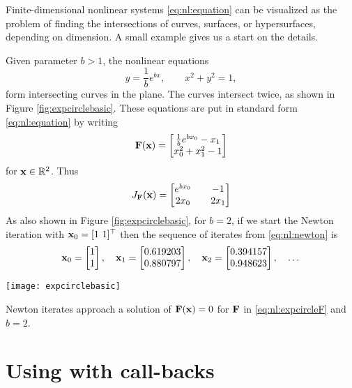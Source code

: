 Finite-dimensional nonlinear systems \eqref{eq:nl:equation} can be visualized as the problem of finding the intersections of curves, surfaces, or hypersurfaces, depending on dimension.  A small example gives us a start on the details.

\clearpage
\noindent\hrulefill
\begin{example}  Given parameter $b > 1$, the nonlinear equations
    $$y = \frac{1}{b} e^{bx}, \qquad x^2+y^2 = 1,$$
form intersecting curves in the plane.  The curves intersect twice, as shown in Figure \ref{fig:expcirclebasic}.  These equations are put in standard form \eqref{eq:nl:equation} by writing
\begin{equation}
\label{eq:nl:expcircleF}
\mathbf{F}(\mathbf{x}) = \begin{bmatrix}
           \frac{1}{b} e^{b x_0} - x_1 \\
           x_0^2 + x_1^2 - 1
           \end{bmatrix}
\end{equation}
for $\mathbf{x}\in \mathbb{R}^2$.  Thus
\begin{equation}
\label{eq:nl:ecjacobian}
J_{\mathbf{F}}(\mathbf{x}) = \begin{bmatrix}
    e^{b x_0} & & -1 \\
    2 x_0   & & 2 x_1 \end{bmatrix}
\end{equation}
As also shown in Figure \ref{fig:expcirclebasic}, for $b=2$, if we start the Newton iteration with $\mathbf{x}_0 = [1 \,\, 1]^\top$ then the sequence of iterates from \eqref{eq:nl:newton} is
    $${\mathbf{x}}_{0} = \begin{bmatrix} 1 \\ 1 \end{bmatrix}, \quad {\mathbf{x}}_{1} = \begin{bmatrix} 0.619203 \\ 0.880797 \end{bmatrix}, \quad {\mathbf{x}}_{2} = \begin{bmatrix} 0.394157 \\ 0.948623 \end{bmatrix}, \quad \dots$$

\begin{marginfigure}
\texttt{[image: expcirclebasic]}
\caption{Newton iterates approach a solution of $\mathbf{F}(\mathbf{x})=0$ for $\mathbf{F}$ in \eqref{eq:nl:expcircleF} and $b=2$.}
\label{fig:expcirclebasic}
\end{marginfigure}

\noindent\hrulefill
\end{example}


\section{Using \pSNES with call-backs} \label{sec:usingsnes}


